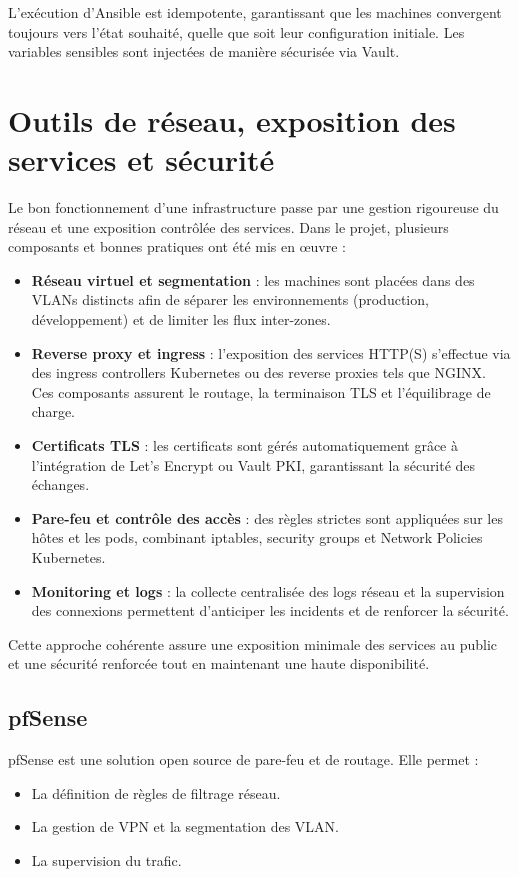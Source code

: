 L'exécution d'Ansible est idempotente, garantissant que les machines convergent toujours vers l'état souhaité, quelle que soit leur configuration initiale.
Les variables sensibles sont injectées de manière sécurisée via Vault.

\section{Outils de réseau, exposition des services et sécurité}

Le bon fonctionnement d'une infrastructure passe par une gestion rigoureuse du réseau et une exposition contrôlée des services.
Dans le projet, plusieurs composants et bonnes pratiques ont été mis en œuvre :

\begin{itemize}
	\item \textbf{Réseau virtuel et segmentation} : les machines sont placées dans des VLANs distincts afin de séparer les environnements (production, développement) et de limiter les flux inter-zones.
	\item \textbf{Reverse proxy et ingress} : l’exposition des services HTTP(S) s’effectue via des ingress controllers Kubernetes ou des reverse proxies tels que NGINX. Ces composants assurent le routage, la terminaison TLS et l’équilibrage de charge.
	\item \textbf{Certificats TLS} : les certificats sont gérés automatiquement grâce à l’intégration de Let’s Encrypt ou Vault PKI, garantissant la sécurité des échanges.
	\item \textbf{Pare-feu et contrôle des accès} : des règles strictes sont appliquées sur les hôtes et les pods, combinant iptables, security groups et Network Policies Kubernetes.
	\item \textbf{Monitoring et logs} : la collecte centralisée des logs réseau et la supervision des connexions permettent d’anticiper les incidents et de renforcer la sécurité.
\end{itemize}

Cette approche cohérente assure une exposition minimale des services au public et une sécurité renforcée tout en maintenant une haute disponibilité.

\subsection{pfSense}

pfSense est une solution open source de pare-feu et de routage. Elle permet :
\begin{itemize}
	\item La définition de règles de filtrage réseau.
	\item La gestion de VPN et la segmentation des VLAN.
	\item La supervision du trafic.
\end{itemize}
